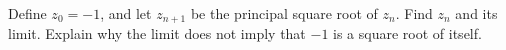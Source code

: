 Define $z_0=-1$, and let $z_{n+1}$ be the principal square root of $z_n$. Find $z_n$ and its limit. Explain why the limit does not imply that $-1$ is a square root of itself.
